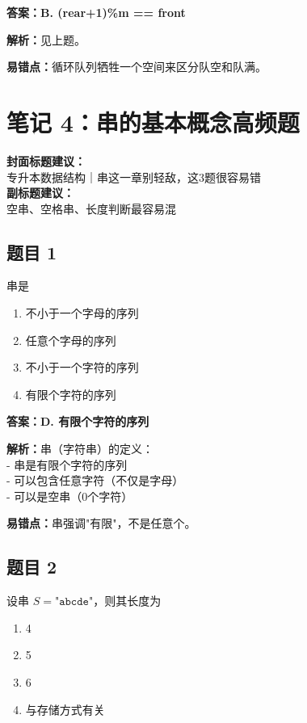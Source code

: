 \documentclass[12pt,a4paper]{ctexart}
\begin{document}
\begin{answerbox}
	\textbf{答案：B. (rear+1)\%m == front}

	\textbf{解析：}见上题。

	\textbf{易错点：}循环队列牺牲一个空间来区分队空和队满。
\end{answerbox}

\newpage

\section{笔记 4：串的基本概念高频题}
\begin{coverbox}
	\textbf{封面标题建议：}\\
	专升本数据结构｜串这一章别轻敌，这3题很容易错\\
	\textbf{副标题建议：}\\
	空串、空格串、长度判断最容易混
\end{coverbox}

\subsection*{题目 1}
串是
\begin{enumerate}[label=\Alph*.]
	\item 不小于一个字母的序列
	\item 任意个字母的序列
	\item 不小于一个字符的序列
	\item 有限个字符的序列
\end{enumerate}

\begin{answerbox}
	\textbf{答案：D. 有限个字符的序列}

	\textbf{解析：}串（字符串）的定义：\\
	- 串是有限个字符的序列\\
	- 可以包含任意字符（不仅是字母）\\
	- 可以是空串（0个字符）

	\textbf{易错点：}串强调"有限"，不是任意个。
\end{answerbox}

\subsection*{题目 2}
设串 $S=\texttt{"abcde"}$，则其长度为
\begin{enumerate}[label=\Alph*.]
	\item 4
	\item 5
	\item 6
	\item 与存储方式有关
\end{enumerate}
\end{document}
